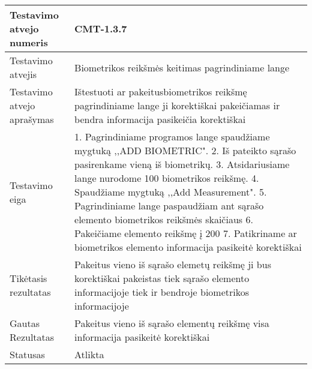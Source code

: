 \documentclass[oneside]{VUMIFPSkursinis}
\begin{document}
\begin{center}
    \begin{tabular}{ |p{5cm}|p{13cm}|}
    \hline
        Testavimo atvejo numeris & CMT-1.3.7  \\ \hline
        Testavimo atvejis & Biometrikos reikšmės keitimas pagrindiniame lange \\ \hline
        Testavimo atvejo aprašymas & Ištestuoti ar pakeitusbiometrikos reikšmę pagrindiniame lange ji korektiškai pakeičiamas ir bendra informacija pasikeičia korektiškai \\ \hline
        Testavimo eiga &  1. Pagrindiniame programos lange spaudžiame mygtuką ,,ADD BIOMETRIC". 
				2. Iš pateikto sąrašo pasirenkame vieną iš biometrikų. 
				3. Atsidariusiame lange nurodome 100 biometrikos reikšmę.
				4. Spaudžiame mygtuką ,,Add Measurement".
				5. Pagrindiniame lange paspaudžiam ant sąrašo elemento biometrikos reikšmės skaičiaus
				6. Pakeičiame elemento reikšmę į 200
				7. Patikriname ar biometrikos elemento informacija pasikeitė korektiškai \\ \hline
        Tikėtasis rezultatas &  Pakeitus vieno iš sąrašo elemetų reikšmę ji bus korektiškai pakeistas tiek sąrašo elemento informacijoje tiek ir bendroje biometrikos informacijoje \\ \hline
        Gautas Rezultatas & Pakeitus vieno iš sąrašo elementų reikšmę visa informacija pasikeitė korektiškai \\ \hline
        Statusas &  Atlikta\\ \hline
    \hline
    \end{tabular}
\end{center}

\iffalse XXXXXXXXXXXXXXXXXXXXXXXXXXXXXXXXXXXXXXXXXXXXXXXXXXXXXXXXXXXXXXXXXXXXXXXXXXXXXXXXXXXXXXXXXXXXXXXXXXXXXXXXXXXXXXXXXXXXXXXXXXXXXXXXXXXXXXX \fi
\end{document}
